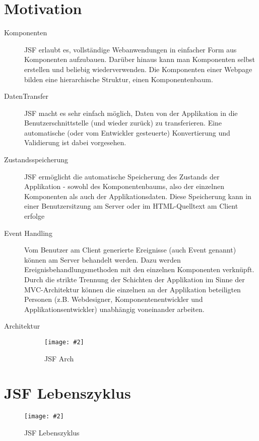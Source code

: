 \documentclass[a4paper,10pt]{scrreprt}
\newcommand{\pic}[2][figure]{\begin{figure}[h]
 \centering
 \texttt{[image: \#2]}
 \caption{#1}
\end{figure}
}
\begin{document}
{\section{Motivation}
\begin{description}
 \item [Komponenten] JSF erlaubt es, vollständige Webanwendungen in einfacher Form aus Komponenten aufzubauen.
Darüber hinaus kann man Komponenten selbst erstellen und beliebig wiederverwenden. Die
Komponenten einer Webpage bilden eine hierarchische Struktur, einen Komponentenbaum.
\item [DatenTransfer] JSF macht es sehr einfach möglich, Daten von der Applikation in die Benutzerschnittstelle (und
wieder zurück) zu transferieren. Eine automatische (oder vom Entwickler gesteuerte)
Konvertierung und Validierung ist dabei vorgesehen.
\item[Zustandsspeicherung] JSF ermöglicht die automatische Speicherung des Zustands der Applikation - sowohl des
Komponentenbaums, also der einzelnen Komponenten als auch der Applikationsdaten. Diese
Speicherung kann in einer Benutzersitzung am Server oder im HTML-Quelltext am Client erfolge
\item[Event Handling] Vom Benutzer am Client generierte Ereignisse (auch Event genannt) können am Server behandelt
werden. Dazu werden Ereignisbehandlungsmethoden mit den einzelnen Komponenten verknüpft.
Durch die strikte Trennung der Schichten der Applikation im Sinne der MVC-Architektur können die
einzelnen an der Applikation beteiligten Personen (z.B. Webdesigner, Komponentenentwickler und
Applikationsentwickler) unabhängig voneinander arbeiten.
\item[Architektur] \pic[JSF Arch]{jsfarch.png}
\end{description}

\section{JSF Lebenszyklus}
\pic[JSF Lebenszyklus]{jsfl.png}

}
\end{document}
